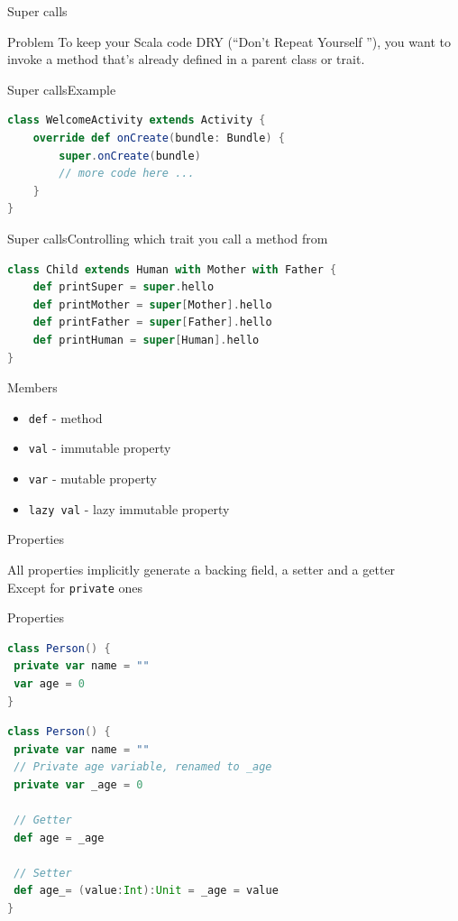 \documentclass[aspectratio=169]{beamer}
\begin{document}
\begin{frame}{Super calls}
  \begin{block}{Problem}
    To keep your Scala code DRY (“Don’t Repeat Yourself ”), you want to invoke a method that’s
    already defined in a parent class or trait.
  \end{block}
\end{frame}

\begin{frame}[fragile]{Super calls}{Example}
\begin{lstlisting}[style=scala,language=scala]
class WelcomeActivity extends Activity {
    override def onCreate(bundle: Bundle) {
        super.onCreate(bundle)
        // more code here ...
    }
}
\end{lstlisting}
\end{frame}

\begin{frame}[fragile]{Super calls}{Controlling which trait you call a method from}
\begin{lstlisting}[style=scala,language=scala]
class Child extends Human with Mother with Father {
    def printSuper = super.hello
    def printMother = super[Mother].hello
    def printFather = super[Father].hello
    def printHuman = super[Human].hello
}
\end{lstlisting}
\end{frame}

\begin{frame}{Members}
\begin{itemize}
  \item \texttt{def} - method
  \item \texttt{val} - immutable property
  \item \texttt{var} - mutable property
  \item \texttt{lazy val} - lazy immutable property
\end{itemize}
\end{frame}

\begin{frame}{Properties}
  \begin{block}{}
    All properties \alert{implicitly} generate a backing field, a setter and a getter \\
    Except for \texttt{private} ones
  \end{block}
\end{frame}

\begin{frame}[fragile]{Properties}
\begin{lstlisting}[style=scala,language=scala]
class Person() {
 private var name = ""
 var age = 0
}
\end{lstlisting}
\pause
\begin{lstlisting}[style=scala,language=scala]
class Person() {
 private var name = ""
 // Private age variable, renamed to _age
 private var _age = 0

 // Getter
 def age = _age

 // Setter
 def age_= (value:Int):Unit = _age = value
}
\end{lstlisting}
\end{frame}
\end{document}
